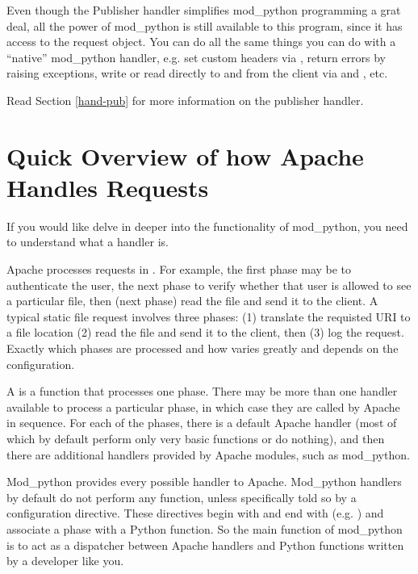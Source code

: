 Even though the Publisher handler simplifies mod_python programming a
grat deal, all the power of mod_python is still available to this
program, since it has access to the request object. You can do all the
same things you can do with a ``native'' mod_python handler, e.g. set
custom headers via , return errors by raising
 exceptions, write or read directly to
and from the client via  and ,
etc.

Read Section \ref{hand-pub} 
for more information on the publisher handler. 

\section{Quick Overview of how Apache Handles Requests\label{tut-overview}}

If you would like delve in deeper into the functionality of
mod_python, you need to understand what a handler is.  

Apache processes requests in . For example, the first
phase may be to authenticate the user, the next phase to verify
whether that user is allowed to see a particular file, then (next
phase) read the file and send it to the client. A typical static file
request involves three phases: (1) translate the requisted URI to a
file location (2) read the file and send it to the client, then (3)
log the request. Exactly which phases are processed and how varies
greatly and depends on the configuration.

A  is a function that processes one phase. There may be
more than one handler available to process a particular phase, in
which case they are called by Apache in sequence. For each of the
phases, there is a default Apache handler (most of which by default
perform only very basic functions or do nothing), and then there are
additional handlers provided by Apache modules, such as mod_python.

Mod_python provides every possible handler to Apache. Mod_python
handlers by default do not perform any function, unless specifically
told so by a configuration directive. These directives begin with
 and end with 
(e.g. ) and associate a phase with a Python
function. So the main function of mod_python is to act as a dispatcher
between Apache handlers and Python functions written by a developer
like you.


